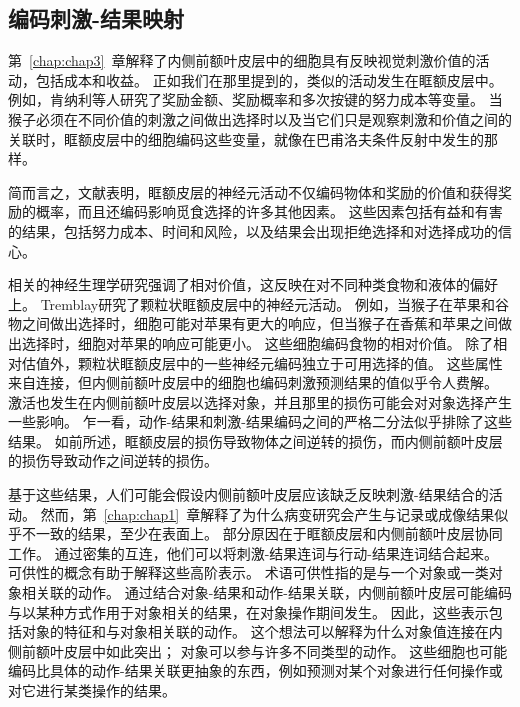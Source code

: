 \subsection{编码刺激-结果映射}

第~\ref{chap:chap3}~章解释了内侧前额叶皮层中的细胞具有反映视觉刺激价值的活动，包括成本和收益。
正如我们在那里提到的，类似的活动发生在眶额皮层中。 
例如，肯纳利等人\cite{kennerley2009evaluating}研究了奖励金额、奖励概率和多次按键的努力成本等变量。
当猴子必须在不同价值的刺激之间做出选择时\cite{seo2008cortical}以及当它们只是观察刺激和价值之间的关联时，眶额皮层中的细胞编码这些变量，就像在巴甫洛夫条件反射中发生的那样\cite{morrison2009convergence}。\par


简而言之，文献表明，眶额皮层的神经元活动不仅编码物体和奖励的价值\cite{padoa2006neurons}和获得奖励的概率\cite{kennerley2009evaluating}，而且还编码影响觅食选择的许多其他因素。
这些因素包括有益和有害的结果\cite{morrison2009convergence}，包括努力成本\cite{kennerley2009evaluating}、时间\cite{roesch2005neuronal}和风险\cite{o2010coding}，以及结果会出现拒绝选择\cite{abe2011distributed}和对选择成功的信心\cite{kepecs2008neural}。\par


相关的神经生理学研究强调了相对价值，这反映在对不同种类食物和液体的偏好上。
Tremblay\cite{tremblay1999relative}研究了颗粒状眶额皮层中的神经元活动。
例如，当猴子在苹果和谷物之间做出选择时，细胞可能对苹果有更大的响应，但当猴子在香蕉和苹果之间做出选择时，细胞对苹果的响应可能更小。
这些细胞编码食物的相对价值。
除了相对估值外，颗粒状眶额皮层中的一些神经元编码独立于可用选择的值\cite{padoa2009range}。
这些属性来自连接，但内侧前额叶皮层中的细胞也编码刺激预测结果的值似乎令人费解\cite{kennerley2009evaluating}。
激活也发生在内侧前额叶皮层以选择对象\cite{behrens2007learning,glascher2009determining}，并且那里的损伤可能会对对象选择产生一些影响\cite{camille2011double}。
乍一看，动作-结果和刺激-结果编码之间的严格二分法似乎排除了这些结果。
如前所述，眶额皮层的损伤导致物体之间逆转的损伤\cite{rudebeck2006separate}，而内侧前额叶皮层的损伤导致动作之间逆转的损伤\cite{kennerley2006optimal}。\par


基于这些结果，人们可能会假设内侧前额叶皮层应该缺乏反映刺激-结果结合的活动。
然而，第~\ref{chap:chap1}~章解释了为什么病变研究会产生与记录或成像结果似乎不一致的结果，至少在表面上。
部分原因在于眶额皮层和内侧前额叶皮层协同工作。
通过密集的互连，他们可以将刺激-结果连词与行动-结果连词结合起来。
可供性的概念有助于解释这些高阶表示。
术语可供性指的是与一个对象或一类对象相关联的动作。
通过结合对象-结果和动作-结果关联，内侧前额叶皮层可能编码与以某种方式作用于对象相关的结果，在对象操作期间发生。
因此，这些表示包括对象的特征和与对象相关联的动作。
这个想法可以解释为什么对象值连接在内侧前额叶皮层中如此突出；
对象可以参与许多不同类型的动作。
这些细胞也可能编码比具体的动作-结果关联更抽象的东西，例如预测对某个对象进行任何操作或对它进行某类操作的结果。\par


